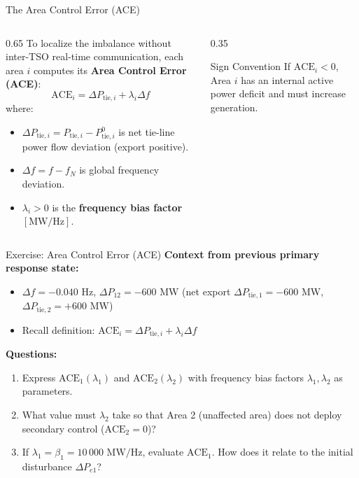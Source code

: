 \begin{frame}{The Area Control Error (ACE)}
\begin{columns}[T]
\begin{column}{0.65\textwidth}
    \footnotesize
    To localize the imbalance without inter-TSO real-time communication, each area $i$ computes its \textbf{Area Control Error (ACE)}:
    \begin{equation*}
        \text{ACE}_i = \Delta P_{\text{tie},i} + \lambda_i \Delta f
    \end{equation*}
    where:
    \begin{itemize}\setlength{\itemsep}{2pt}
        \item $\Delta P_{\text{tie},i} = P_{\text{tie},i} - P_{\text{tie},i}^0$ is net tie-line power flow deviation (export positive).
        \item $\Delta f = f - f_N$ is global frequency deviation.
        \item $\lambda_i > 0$ is the \textbf{frequency bias factor} $[\text{MW/Hz}]$.
    \end{itemize}
\end{column}
\begin{column}{0.35\textwidth}
    \begin{block}{Sign Convention}
    \scriptsize
    If $\text{ACE}_i < 0$, Area $i$ has an internal active power deficit and must increase generation.
    \end{block}
\end{column}
\end{columns}
\end{frame}

\begin{frame}{Exercise: Area Control Error (ACE)}
\footnotesize
\textbf{Context from previous primary response state:}
\begin{itemize}\setlength{\itemsep}{1pt}
    \item $\Delta f = -0.040\text{ Hz}$, \quad $\Delta P_{12} = -600\text{ MW}$ (net export $\Delta P_{\text{tie},1} = -600\text{ MW}$, $\Delta P_{\text{tie},2} = +600\text{ MW}$)
    \item Recall definition: $\text{ACE}_i = \Delta P_{\text{tie},i} + \lambda_i \Delta f$
\end{itemize}

\vspace{2pt}
\textbf{Questions:}
\begin{enumerate}\setlength{\itemsep}{2pt}
    \item Express $\text{ACE}_1(\lambda_1)$ and $\text{ACE}_2(\lambda_2)$ with frequency bias factors $\lambda_1, \lambda_2$ as parameters.
    \item What value must $\lambda_2$ take so that Area 2 (unaffected area) does not deploy secondary control ($\text{ACE}_2 = 0$)?
    \item If $\lambda_1 = \beta_1 = 10\,000\text{ MW/Hz}$, evaluate $\text{ACE}_1$. How does it relate to the initial disturbance $\Delta P_{e1}$?
\end{enumerate}

\vfill
\end{frame}

